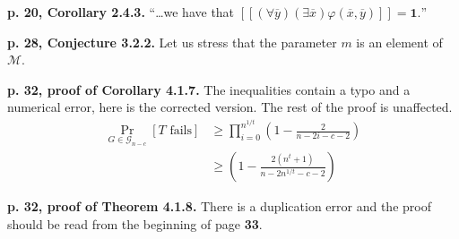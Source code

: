 \documentclass{article}
\def\llbracket{[\![}
\def\rrbracket{]\!]}
\newcommand{\bbl}{\llbracket}
\newcommand{\bbr}{\rrbracket}
\newcommand{\1}{\textbf{1}}
\newcommand{\0}{\textbf{0}}
\newcommand{\M}{\mathcal{M}}
\newcommand{\G}{\mathcal{G}}
\begin{document}
\vspace{0.5em}
\textbf{p. 20, Corollary 2.4.3.} ``\ldots we have that $\bbl(\forall\overline y)(\exists \overline x)\varphi(\overline x,\overline y)\bbr=\1.$''

\vspace{0.5em}
\textbf{p. 28, Conjecture 3.2.2.} Let us stress that the parameter $m$ is an element of $\M$.

\vspace{0.5em}
\textbf{p. 32, proof of Corollary 4.1.7.} The inequalities contain a typo and a numerical error, here is the corrected version. The rest of the proof is unaffected.
\begin{align*}
\Pr_{G\in\G_{n-c}}[\text{$T$ fails}]&\geq \prod_{i=0}^{n^{1/t}}\left(1-\frac{2}{n-2i-c-2}\right)\tag{4.26}\\
&\geq \left(1-\frac{2(n^t+1)}{n-2n^{1/t}-c-2}\right)\tag{4.27}
\end{align*}

\vspace{0.5em}
\textbf{p. 32, proof of Theorem 4.1.8.} There is a duplication error and the proof should be read from the beginning of page \textbf{33}.
\end{document}
